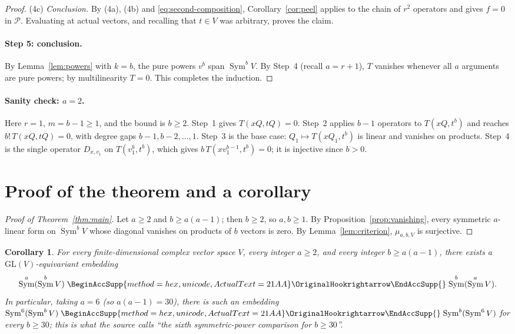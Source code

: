 \documentclass[11pt]{article}
\renewcommand{\hookrightarrow}{\mathrel{
  \BeginAccSupp{method=hex,unicode,ActualText=21AA}
  \OriginalHookrightarrow\EndAccSupp{}}}
\newtheorem{corollary}[theorem]{Corollary}
\theoremstyle{remark}
\DeclareMathOperator{\Sym}{Sym}
\newcommand{\D}[2]{D_{#1,#2}}
\newcommand{\PP}{\mathcal P}
\begin{document}
\begin{proof}
(4c) \emph{Conclusion.} By (4a), (4b) and \eqref{eq:second-composition},
Corollary~\ref{cor:peel} applies to the chain of $r^2$ operators and gives
$f=0$ in $\PP$. Evaluating at actual vectors, and recalling that $t\in V$
was arbitrary, proves the claim.

\paragraph{Step 5: conclusion.}
By Lemma~\ref{lem:powers} with $k=b$, the pure powers $v^b$ span
$\Sym^bV$. By Step~4 (recall $a=r+1$), $T$ vanishes whenever all $a$
arguments are pure powers; by multilinearity $T=0$. This completes the
induction.
\end{proof}

\paragraph{Sanity check: $a=2$.}
Here $r=1$, $m=b-1\ge1$, and the bound is $b\ge2$. Step~1 gives
$T(xQ,tQ)=0$. Step~2 applies $b-1$ operators to $T(xQ,t^b)$ and reaches
$b!\,T(xQ,tQ)=0$, with degree gaps $b-1,b-2,\dots,1$. Step~3 is the base
case: $Q_1\mapsto T(xQ_1,t^b)$ is linear and vanishes on products. Step~4
is the single operator $\D{x}{v_1}$ on $T(v_1^b,t^b)$, which gives
$b\,T(xv_1^{b-1},t^b)=0$; it is injective since $b>0$.

\section{Proof of the theorem and a corollary}\label{sec:comparison}

\begin{proof}[Proof of Theorem~\ref{thm:main}]
Let $a\ge2$ and $b\ge a(a-1)$; then $b\ge2$, so $a,b\ge1$. By
Proposition~\ref{prop:vanishing}, every symmetric $a$-linear form on
$\Sym^bV$ whose diagonal vanishes on products of $b$ vectors is zero. By
Lemma~\ref{lem:criterion}, $\mu_{a,b,V}$ is surjective.
\end{proof}

\begin{corollary}\label{cor:comparison}
For every finite-dimensional complex vector space $V$, every integer
$a\ge2$, and every integer $b\ge a(a-1)$, there exists a
$\mathrm{GL}(V)$-equivariant embedding
\[
 \Sym^a(\Sym^b V)\hookrightarrow\Sym^b(\Sym^a V).
\]
In particular, taking $a=6$ (so $a(a-1)=30$), there is such an embedding
$\Sym^6(\Sym^bV)\hookrightarrow\Sym^b(\Sym^6V)$ for every $b\ge30$; this is
what the source calls ``the sixth symmetric-power comparison for
$b\ge30$''.
\end{corollary}
\end{document}
